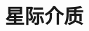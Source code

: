 \documentclass[../天体物理基础.tex]{subfiles}
\begin{document}
\section{星际介质}

\printbibliography
\end{document}
